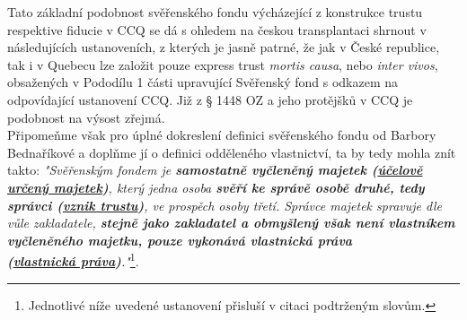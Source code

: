 \documentclass{article}
\begin{document}
 
 





Tato základní podobnost svěřenského fondu výcházející z konstrukce trustu respektive fiducie v CCQ se dá s ohledem na českou transplantaci shrnout v následujících ustanoveních, z kterých je jasně patrné, že jak v České republice, tak i v Quebecu lze založit pouze express trust \textit{mortis causa}, nebo \textit{inter vivos}, obsažených v Pododílu 1 části upravující Svěřenský fond s odkazem na odpovídající ustanovení CCQ. Již z § 1448 OZ a jeho protějšků v CCQ je podobnost na výsost zřejmá.\\

Připomeňme však pro úplné dokreslení definici svěřenského fondu od Barbory Bednaříkové a doplňme jí o definici odděleného vlastnictví, ta by tedy mohla znít takto: \textit{"Svěřenským fondem je \textbf{samostatně vyčleněný majetek (\underline{účelově určený majetek})}, který jedna osoba \textbf{svěří ke správě osobě druhé, tedy správci (\underline{vznik trustu})}, ve prospěch osoby třetí. Správce majetek spravuje dle vůle zakladatele, \textbf{stejně jako zakladatel a obmyšlený však není vlastníkem vyčleněného majetku, pouze vykonává vlastnická práva\\ (\underline{vlastnická práva})}."}\footnote{Jednotlivé níže uvedené ustanovení přisluší v citaci podtrženým slovům.}.\\
\end{document}
